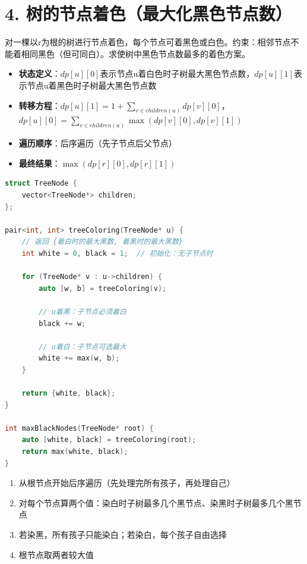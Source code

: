 \section*{4. 树的节点着色（最大化黑色节点数）}

对一棵以r为根的树进行节点着色，每个节点可着黑色或白色。约束：相邻节点不能着相同黑色（但可同白）。求使树中黑色节点数最多的着色方案。

\begin{itemize}
    \item \textbf{状态定义}：$dp[u][0]$表示节点u着白色时子树最大黑色节点数，$dp[u][1]$表示节点u着黑色时子树最大黑色节点数
    \item \textbf{转移方程}：$dp[u][1] = 1 + \sum_{v \in children(u)} dp[v][0]$，$dp[u][0] = \sum_{v \in children(u)} \max(dp[v][0], dp[v][1])$
    \item \textbf{遍历顺序}：后序遍历（先子节点后父节点）
    \item \textbf{最终结果}：$\max(dp[r][0], dp[r][1])$
\end{itemize}

\begin{lstlisting}[language=C++, style=cppstyle]
struct TreeNode {
    vector<TreeNode*> children;
};

pair<int, int> treeColoring(TreeNode* u) {
    // 返回 {着白时的最大黑数, 着黑时的最大黑数}
    int white = 0, black = 1;  // 初始化：无子节点时

    for (TreeNode* v : u->children) {
        auto [w, b] = treeColoring(v);

        // u着黑：子节点必须着白
        black += w;

        // u着白：子节点可选最大
        white += max(w, b);
    }

    return {white, black};
}

int maxBlackNodes(TreeNode* root) {
    auto [white, black] = treeColoring(root);
    return max(white, black);
}
\end{lstlisting}

\begin{enumerate}
    \item 从根节点开始后序遍历（先处理完所有孩子，再处理自己）
    \item 对每个节点算两个值：染白时子树最多几个黑节点、染黑时子树最多几个黑节点
    \item 若染黑，所有孩子只能染白；若染白，每个孩子自由选择
    \item 根节点取两者较大值
\end{enumerate}

